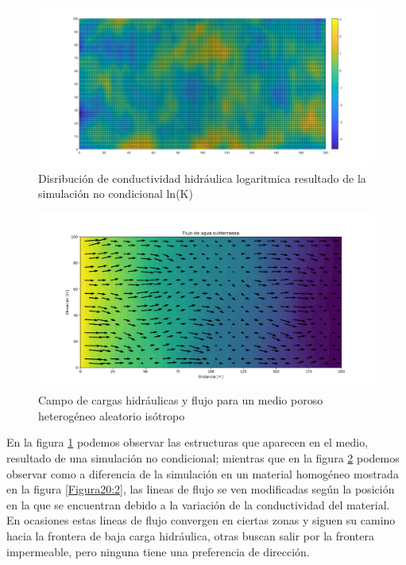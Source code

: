 \newpage


\begin{figure}[H]
\centering
\includegraphics[scale=0.45]{Figura_37.1.png}
\caption{ Disribución de conductividad hidráulica logaritmica resultado de la simulación no condicional ln(K)}
\label{Figura3:9.1}
\end{figure}

 \begin{figure}[H]
\centering
\includegraphics[scale=0.50]{Figure_37.png}
\caption{ Campo de cargas hidráulicas y flujo para un medio poroso heterogéneo aleatorio isótropo}
\label{Figura3:9}
\end{figure}

\newpage


En la figura \ref{Figura3:9.1} podemos observar las estructuras que aparecen en el medio, resultado de una simulación no condicional; mientras que en la figura \ref{Figura3:9} podemos observar como a diferencia de la simulación en un material homogéneo mostrada en la figura \ref{Figura20:2}, las lineas de flujo se ven modificadas según la posición en la que se encuentran debido a la variación de la conductividad del material. En ocasiones estas lineas de flujo convergen en ciertas zonas y siguen su camino hacia la frontera de baja carga hidráulica, otras buscan salir por la frontera impermeable, pero ninguna tiene una preferencia de dirección.
\\

